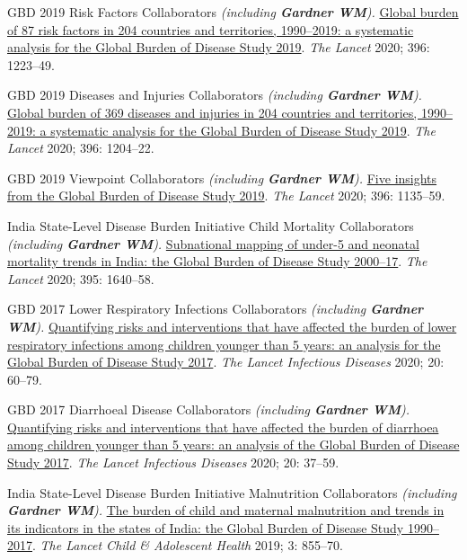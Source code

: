 \documentclass[11pt,article,oneside]{memoir}
\begin{document}
\ind GBD 2019 Risk Factors Collaborators \emph{(including \textbf{Gardner WM}).} \href{https://doi.org/10.1016/S0140-6736(20)30752-2}{Global burden of 87 risk factors in 204
countries and territories, 1990--2019: a systematic analysis for the Global Burden of Disease Study 2019}. \emph{The Lancet} 2020; 396: 1223--49.

\ind GBD 2019 Diseases and Injuries Collaborators \emph{(including \textbf{Gardner WM}).} \href{https://doi.org/10.1016/S0140-6736(20)30925-9}{Global burden of 369 diseases and
injuries in 204 countries and territories, 1990--2019: a systematic analysis for the Global Burden of Disease
Study 2019}. \emph{The Lancet} 2020; 396: 1204--22.

\ind GBD 2019 Viewpoint Collaborators \emph{(including \textbf{Gardner WM}).} \href{https://doi.org/10.1016/S0140-6736(20)31404-5}{Five insights from the Global Burden of Disease Study 2019}. 
\emph{The Lancet} 2020; 396: 1135--59.

\ind India State-Level Disease Burden Initiative Child Mortality Collaborators \emph{(including \textbf{Gardner WM}).} \href{https://doi.org/10.1016/S0140-6736(20)30471-2}{Subnational mapping of under-5 and neonatal mortality trends in India: the Global Burden of Disease Study
2000--17}. \emph{The Lancet} 2020; 395: 1640--58.

\ind GBD 2017 Lower Respiratory Infections Collaborators \emph{(including \textbf{Gardner WM}).} \href{https://doi.org/10.1016/S1473-3099(19)30410-4}{Quantifying risks and interventions that have affected
the burden of lower respiratory infections among children younger than 5 years: an analysis for the Global
Burden of Disease Study 2017}. \emph{The Lancet Infectious Diseases} 2020; 20: 60--79.

\ind GBD 2017 Diarrhoeal Disease Collaborators \emph{(including \textbf{Gardner WM}).} \href{https://doi.org/10.1016/S1473-3099(19)30401-3}{Quantifying risks and interventions that have
affected the burden of diarrhoea among children younger than 5 years: an analysis of the Global Burden of
Disease Study 2017}. \emph{The Lancet Infectious Diseases} 2020; 20: 37--59.

\ind India State-Level Disease Burden Initiative Malnutrition Collaborators \emph{(including \textbf{Gardner WM}).} \href{https://doi.org/10.1016/S2352-4642(19)30273-1}{The burden
of child and maternal malnutrition and trends in its indicators in the states of India: the Global Burden of
Disease Study 1990--2017}. \emph{The Lancet Child \& Adolescent Health} 2019; 3: 855--70.
\end{document}
